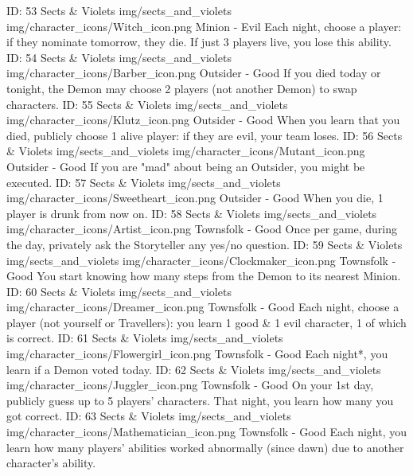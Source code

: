 	{ID: 53}
	{Sects \& Violets}
	{img/sects_and_violets}
	{img/character_icons/Witch_icon.png}
	{\color{evilcolor}Minion - Evil}
	{Each night, choose a player: if they nominate tomorrow, they die. If just 3 players live, you lose this ability.}        
	{ID: 54}
	{Sects \& Violets}
	{img/sects_and_violets}
	{img/character_icons/Barber_icon.png}
	{\color{goodcolor}Outsider - Good}
	{If you died today or tonight, the Demon may choose 2 players (not another Demon) to swap characters.}        
	{ID: 55}
	{Sects \& Violets}
	{img/sects_and_violets}
	{img/character_icons/Klutz_icon.png}
	{\color{goodcolor}Outsider - Good}
	{When you learn that you died, publicly choose 1 alive player: if they are evil, your team loses.}        
	{ID: 56}
	{Sects \& Violets}
	{img/sects_and_violets}
	{img/character_icons/Mutant_icon.png}
	{\color{goodcolor}Outsider - Good}
	{If you are "mad" about being an Outsider, you might be executed.}        
	{ID: 57}
	{Sects \& Violets}
	{img/sects_and_violets}
	{img/character_icons/Sweetheart_icon.png}
	{\color{goodcolor}Outsider - Good}
	{When you die, 1 player is drunk from now on.}        
	{ID: 58}
	{Sects \& Violets}
	{img/sects_and_violets}
	{img/character_icons/Artist_icon.png}
	{\color{goodcolor}Townsfolk - Good}
	{Once per game, during the day, privately ask the Storyteller any yes/no question.}        
	{ID: 59}
	{Sects \& Violets}
	{img/sects_and_violets}
	{img/character_icons/Clockmaker_icon.png}
	{\color{goodcolor}Townsfolk - Good}
	{You start knowing how many steps from the Demon to its nearest Minion.}        
	{ID: 60}
	{Sects \& Violets}
	{img/sects_and_violets}
	{img/character_icons/Dreamer_icon.png}
	{\color{goodcolor}Townsfolk - Good}
	{Each night, choose a player (not yourself or Travellers): you learn 1 good \& 1 evil character, 1 of which is correct.}        
	{ID: 61}
	{Sects \& Violets}
	{img/sects_and_violets}
	{img/character_icons/Flowergirl_icon.png}
	{\color{goodcolor}Townsfolk - Good}
	{Each night*, you learn if a Demon voted today.}        
	{ID: 62}
	{Sects \& Violets}
	{img/sects_and_violets}
	{img/character_icons/Juggler_icon.png}
	{\color{goodcolor}Townsfolk - Good}
	{On your 1st day, publicly guess up to 5 players' characters. That night, you learn how many you got correct.}        
	{ID: 63}
	{Sects \& Violets}
	{img/sects_and_violets}
	{img/character_icons/Mathematician_icon.png}
	{\color{goodcolor}Townsfolk - Good}
	{Each night, you learn how many players' abilities worked abnormally (since dawn) due to another character's ability.}        

